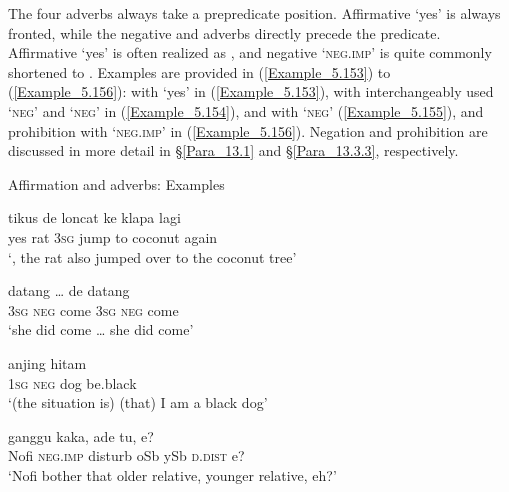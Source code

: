 The four adverbs always take a prepredicate position. Affirmative  ‘yes’ is always fronted, while the negative and  adverbs directly precede the predicate. Affirmative  ‘yes’ is often realized as , and negative  ‘\textsc{neg.imp}’ is quite commonly shortened to . Examples are provided in (\ref{Example_5.153}) to (\ref{Example_5.156}):  with  ‘yes’ in (\ref{Example_5.153}),  with interchangeably used  ‘\textsc{neg}’ and  ‘\textsc{neg}’ in (\ref{Example_5.154}), and with  ‘\textsc{neg}’ (\ref{Example_5.155}), and prohibition with  ‘\textsc{neg.imp}’ in (\ref{Example_5.156}). Negation and prohibition are discussed in more detail in §\ref{Para_13.1} and §\ref{Para_13.3.3}, respectively.


\begin{styleExampleTitle}
Affirmation and  adverbs: Examples
\end{styleExampleTitle}

\ea
\label{Example_5.153}
 {tikus} {de} {loncat} {ke} {klapa} {lagi}\\ %
 yes  rat  \textsc{3sg}  jump  to  coconut  again\\
\glt 
‘, the rat also jumped over to the coconut tree’ \textstyleExampleSource{[080917-003b-CvEx.0025]}
\z

\ea
\label{Example_5.154}
 {} {datang} {{\ldots}} {de} {} {datang}\\ %
 \textsc{3sg}  \textsc{neg}  come {}   \textsc{3sg}  \textsc{neg}  come\\
\glt 
‘she did  come {\ldots} she did  come’ \textstyleExampleSource{[081010-001-Cv.0204-0205]}
\z

\ea
\label{Example_5.155}
 {} {anjing} {hitam}\\ %
 \textsc{1sg}  \textsc{neg}  dog  be.black\\
\glt 
‘(the situation is)  (that) I am a black dog’ \textstyleExampleSource{[081115-001a-Cv.0266]}
\z

\ea
\label{Example_5.156}
 {} {ganggu} {kaka,} {ade} {tu,} {e?}\\ %
 Nofi  \textsc{neg.imp}  disturb  oSb  ySb  \textsc{d.dist}  e?\\
\glt
‘Nofi  bother that older relative, younger relative, eh?’ \textstyleExampleSource{[081011-009-Cv.0013]}
\z



